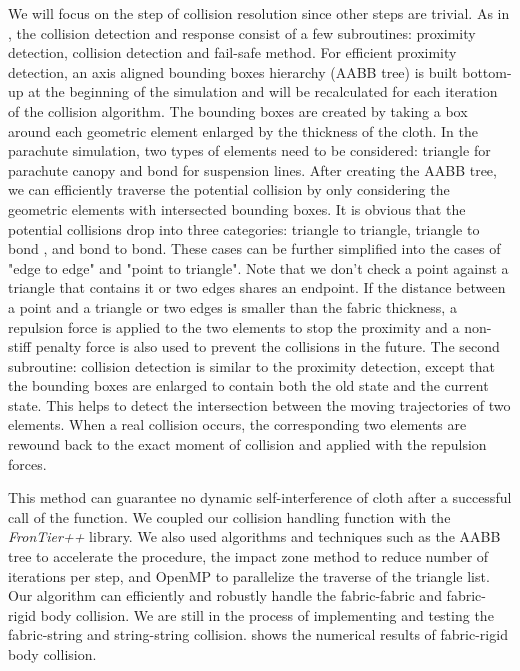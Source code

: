 We will focus on the step of collision resolution since other steps are trivial. As in \cite{Bridson02}, the collision detection and response consist of a few subroutines: proximity detection, collision detection and fail-safe method. For efficient proximity detection, an axis aligned bounding boxes hierarchy (AABB tree) is built bottom-up at the beginning of the simulation and will be recalculated for each iteration of the collision algorithm. The bounding boxes are created by taking a box around each geometric element enlarged by the thickness of the cloth. In the parachute simulation, two types of elements need to be considered: triangle for parachute canopy and bond for suspension lines. After creating the AABB tree, we can efficiently traverse the potential collision by only considering the geometric elements with intersected bounding boxes. It is obvious that the potential collisions drop into three categories: triangle to triangle, triangle to bond , and bond to bond. These cases can be further simplified into the cases of "edge to edge" and "point to triangle". Note that we don't check a point against a triangle that contains it or two edges shares an endpoint. If the distance between a point and a triangle or two edges is smaller than the fabric thickness, a repulsion force is applied to the two elements to stop the proximity and a non-stiff penalty force is also used to prevent the collisions in the future. The second subroutine: collision detection is similar to the proximity detection, except that the bounding boxes are enlarged to contain both the old state and the current state. This helps to detect the intersection between the moving trajectories of two elements. When a real collision occurs, the corresponding two elements are rewound back to the exact moment of collision and applied with the repulsion forces. 

This method can guarantee no dynamic self-interference of cloth after a successful
call of the function. We coupled our collision handling function with the {\it
FronTier++} library. We also used algorithms and techniques such as the AABB
tree to accelerate the procedure, the impact zone method to reduce number of
iterations per step, and OpenMP to parallelize the traverse of the triangle
list.  Our algorithm can efficiently and robustly handle the fabric-fabric and
fabric-rigid body collision. We are still in the process of implementing and
testing the fabric-string and string-string collision.  
shows the numerical results of fabric-rigid body collision.

